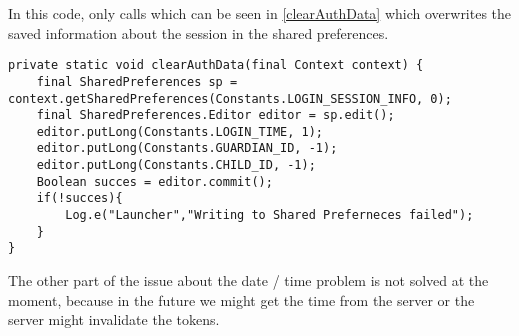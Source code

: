 In this code,  only calls  which can be
seen in \autoref{clearAuthData} which overwrites the saved information about the
session in the shared preferences.\nl

\begin{minipage}[H]{\linewidth}
\begin{lstlisting}[caption = ClearAuthData methode, label = clearAuthData]
private static void clearAuthData(final Context context) {
    final SharedPreferences sp = context.getSharedPreferences(Constants.LOGIN_SESSION_INFO, 0);
    final SharedPreferences.Editor editor = sp.edit();
    editor.putLong(Constants.LOGIN_TIME, 1);
    editor.putLong(Constants.GUARDIAN_ID, -1);
    editor.putLong(Constants.CHILD_ID, -1);
    Boolean succes = editor.commit();
    if(!succes){
    	Log.e("Launcher","Writing to Shared Preferneces failed");
    }
}
\end{lstlisting} 
\end{minipage}

The other part of the issue about the date / time problem is not solved at the
moment, because in the future we might get the time from the server or the server
might invalidate the tokens.

